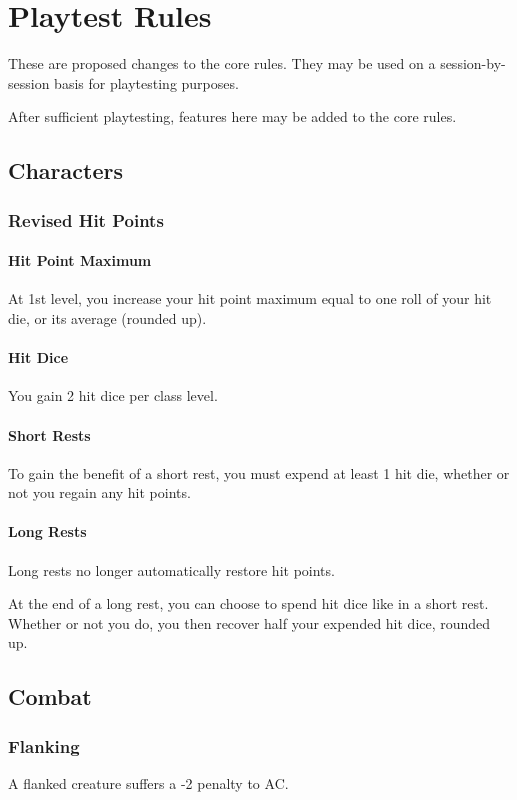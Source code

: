 \documentclass[House_Rules.tex]{subfiles}
\begin{document}
\chapter{Playtest Rules}
\label{chapter3}
These are proposed changes to the core rules. They may be used on a session-by-session basis for playtesting purposes. 

After sufficient playtesting, features here may be added to the core rules.

\section{Characters}

\subsection{Revised Hit Points}

\subsubsection{Hit Point Maximum}
At 1st level, you increase your hit point maximum equal to one roll of your hit die, or its average (rounded up).

\subsubsection{Hit Dice}
You gain 2 hit dice per class level. 

\subsubsection{Short Rests}
To gain the benefit of a short rest, you must expend at least 1 hit die, whether or not you regain any hit points.

\subsubsection{Long Rests}
Long rests no longer automatically restore hit points.

At the end of a long rest, you can choose to spend hit dice like in a short rest. Whether or not you do, you then recover half your expended hit dice, rounded up.

\section{Combat}

\subsection{Flanking}
A flanked creature suffers a -2 penalty to AC.
\end{document}
